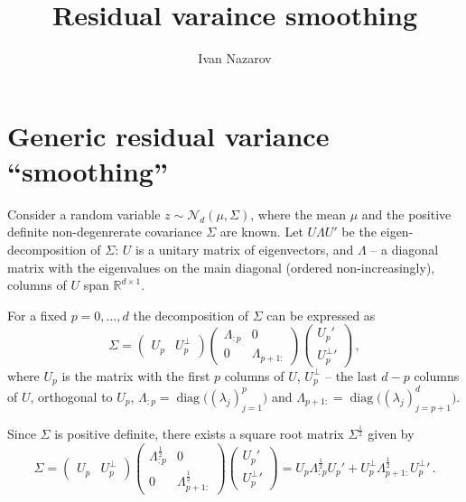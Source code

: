 \documentclass[a4paper,14pt]{article}
\title{Residual varaince smoothing}
\author{Ivan Nazarov}
\newcommand{\diag}{\mathop{\text{diag}}\nolimits}
\begin{document}
\maketitle

\section{Generic residual variance ``smoothing''} %
\label{sec:generic_residual_variance_smoothing}

Consider a random variable $z\sim \mathcal{N}_d(\mu, \Sigma)$, where the mean $\mu$
and the positive definite non-degenrerate covariance $\Sigma$ are known. Let $U \Lambda U'$
be the eigen-decomposition of $\Sigma$: $U$ is a unitary matrix of eigenvectors, and
$\Lambda$ -- a diagonal matrix with the eigenvalues on the main diagonal (ordered
non-increasingly), columns of $U$ span $\mathbb{R}^{d\times 1}$.

For a fixed $p=0,\ldots, d$ the decomposition of $\Sigma$ can be expressed as
$$ \Sigma
    = \begin{pmatrix}U_p & U_p^\perp\end{pmatrix}
    \begin{pmatrix}\Lambda_{:p} & 0\\0&\Lambda_{p+1:}\end{pmatrix}
    \begin{pmatrix}U_p'\\{U_p^\perp}'\end{pmatrix}\,,$$
where $U_p$ is the matrix with the first $p$ columns of $U$, $U_p^\perp$ -- the last
$d-p$ columns of $U$, orthogonal to $U_p$, $\Lambda_{:p}=\diag\bigl((\lambda_j)_{j=1}^p\bigr)$
and $\Lambda_{p+1:}=\diag\bigl((\lambda_j)_{j=p+1}^d\bigr)$.

Since $\Sigma$ is positive definite, there exists a square root matrix $\Sigma^\frac{1}{2}$
given by
$$\Sigma
    = \begin{pmatrix}U_p & U_p^\perp\end{pmatrix}
    \begin{pmatrix}\Lambda_{:p}^\frac{1}{2} & 0\\0&\Lambda_{p+1:}^\frac{1}{2}\end{pmatrix}
    \begin{pmatrix}U_p'\\{U_p^\perp}'\end{pmatrix}
    = U_p \Lambda_{:p}^\frac{1}{2} U_p' + U_p^\perp \Lambda_{p+1:}^\frac{1}{2} {U_p^\perp}'\,.$$
\end{document}
